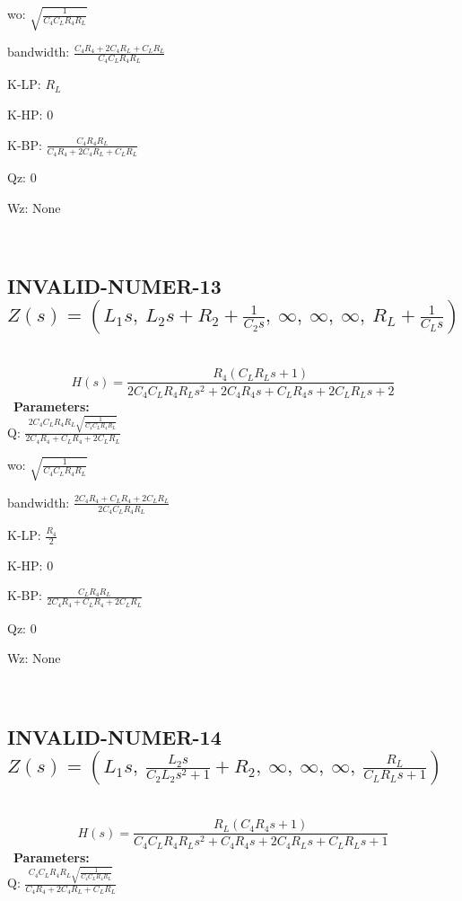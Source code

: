 \documentclass{article}
\begin{document}
wo: $\sqrt{\frac{1}{C_{4} C_{L} R_{4} R_{L}}}$\ 

bandwidth: $\frac{C_{4} R_{4} + 2 C_{4} R_{L} + C_{L} R_{L}}{C_{4} C_{L} R_{4} R_{L}}$\ 

K-LP: $R_{L}$\ 

K-HP: $0$\ 

K-BP: $\frac{C_{4} R_{4} R_{L}}{C_{4} R_{4} + 2 C_{4} R_{L} + C_{L} R_{L}}$\ 

Qz: $0$\ 

Wz: $\text{None}$\ 

\ 

\subsection{INVALID-NUMER-13 $Z(s) = \left( L_{1} s, \  L_{2} s + R_{2} + \frac{1}{C_{2} s}, \  \infty, \  \infty, \  \infty, \  R_{L} + \frac{1}{C_{L} s}\right)$ } \ 
\textbf{\[H(s) = \frac{R_{4} \left(C_{L} R_{L} s + 1\right)}{2 C_{4} C_{L} R_{4} R_{L} s^{2} + 2 C_{4} R_{4} s + C_{L} R_{4} s + 2 C_{L} R_{L} s + 2}\] } \ 
\textbf{Parameters:}\\ 

Q: $\frac{2 C_{4} C_{L} R_{4} R_{L} \sqrt{\frac{1}{C_{4} C_{L} R_{4} R_{L}}}}{2 C_{4} R_{4} + C_{L} R_{4} + 2 C_{L} R_{L}}$\ 

wo: $\sqrt{\frac{1}{C_{4} C_{L} R_{4} R_{L}}}$\ 

bandwidth: $\frac{2 C_{4} R_{4} + C_{L} R_{4} + 2 C_{L} R_{L}}{2 C_{4} C_{L} R_{4} R_{L}}$\ 

K-LP: $\frac{R_{4}}{2}$\ 

K-HP: $0$\ 

K-BP: $\frac{C_{L} R_{4} R_{L}}{2 C_{4} R_{4} + C_{L} R_{4} + 2 C_{L} R_{L}}$\ 

Qz: $0$\ 

Wz: $\text{None}$\ 

\ 

\subsection{INVALID-NUMER-14 $Z(s) = \left( L_{1} s, \  \frac{L_{2} s}{C_{2} L_{2} s^{2} + 1} + R_{2}, \  \infty, \  \infty, \  \infty, \  \frac{R_{L}}{C_{L} R_{L} s + 1}\right)$ } \ 
\textbf{\[H(s) = \frac{R_{L} \left(C_{4} R_{4} s + 1\right)}{C_{4} C_{L} R_{4} R_{L} s^{2} + C_{4} R_{4} s + 2 C_{4} R_{L} s + C_{L} R_{L} s + 1}\] } \ 
\textbf{Parameters:}\\ 

Q: $\frac{C_{4} C_{L} R_{4} R_{L} \sqrt{\frac{1}{C_{4} C_{L} R_{4} R_{L}}}}{C_{4} R_{4} + 2 C_{4} R_{L} + C_{L} R_{L}}$\ 
\end{document}
